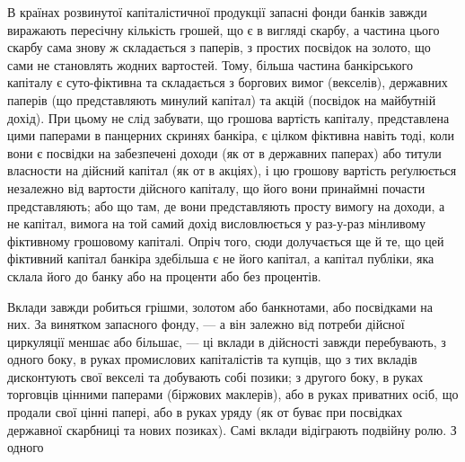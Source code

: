 В країнах розвинутої капіталістичної продукції запасні фонди банків
завжди виражають пересічну кількість грошей, що є в вигляді скарбу, а частина
цього скарбу сама знову ж складається з паперів, з простих посвідок на золото,
що сами не становлять жодних вартостей. Тому, більша частина банкірського
капіталу є суто-фіктивна та складається з боргових вимог (векселів), державних
паперів (що представляють минулий капітал) та акцій (посвідок на майбутній
дохід). При цьому не слід забувати, що грошова вартість капіталу,
представлена цими паперами в панцерних скринях банкіра, є цілком фіктивна
навіть тоді, коли вони є посвідки на забезпечені доходи (як от в державних
паперах) або титули власности на дійсний капітал (як от в акціях), і цю грошову
вартість реґулюється незалежно від вартости дійсного капіталу, що його
вони принаймні почасти представляють; або що там, де вони представляють просту
вимогу на доходи, а не капітал, вимога на той самий дохід висловлюється у
раз-у-раз мінливому фіктивному грошовому капіталі. Опріч того, сюди долучається
ще й те, що цей фіктивний капітал банкіра здебільша є не його капітал,
а капітал публіки, яка склала його до банку або на проценти або без процентів.

Вклади завжди робиться грішми, золотом або банкнотами, або посвідками
на них. За винятком запасного фонду, — а він залежно від потреби дійсної циркуляції
меншає або більшає, — ці вклади в дійсності завжди перебувають, з одного
боку, в руках промислових капіталістів та купців, що з тих вкладів дисконтують
свої векселі та добувають собі позики; з другого боку, в руках торговців
цінними паперами (біржових маклерів), або в руках приватних осіб, що продали
свої цінні папері, або в руках уряду (як от буває при посвідках державної
скарбниці та нових позиках). Самі вклади відіграють подвійну ролю. З одного
\parbreak{}  %
